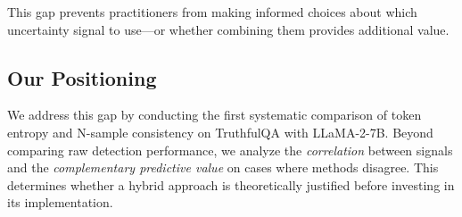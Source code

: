 This gap prevents practitioners from making informed choices about which uncertainty signal to use---or whether combining them provides additional value.

\subsection{Our Positioning}

We address this gap by conducting the first systematic comparison of token entropy and N-sample consistency on TruthfulQA with LLaMA-2-7B. Beyond comparing raw detection performance, we analyze the \emph{correlation} between signals and the \emph{complementary predictive value} on cases where methods disagree. This determines whether a hybrid approach is theoretically justified before investing in its implementation.
